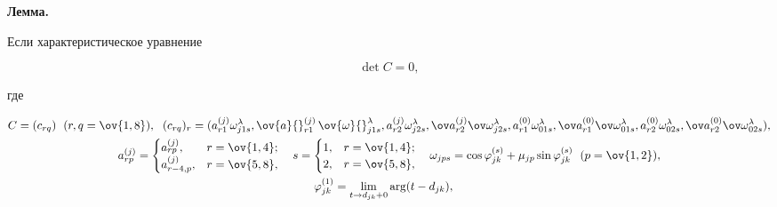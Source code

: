 {\bf Лемма.}{\it 


Если характеристическое уравнение 


\begin{equation} 


\det C=0, 


\end{equation} 


где 


\begin{gather*} 


C=(c_{rq})\ \; (r,q=\ov{1,8}),\ \;


(c_{rq})_r=(a^{(j)}_{r1}\omega^\lambda_{j1s}, 


\ov{a}{}^{(j)}_{r1}\,\ov{\omega}{}^\lambda_{j1s}, 


a^{(j)}_{r2}\omega^\lambda_{j2s},\ov a{}^{(j)}_{r2} 


\ov\omega{}^\lambda_{j2s},a^{(0)}_{r1}\omega^\lambda_{01s},


\ov a{}^{(0)}_{r1} 


\ov\omega{}^\lambda_{01s}, a^{(0)}_{r2} 


\omega^\lambda_{02s},\ov a{}^{(0)}_{r2} 


\ov\omega{}^\lambda_{02s}),\\ 


% 


a^{(j)}_{rp}= 


\begin{cases} 


a^{(j)}_{rp}, & r=\ov{1,4}; \\ 


a^{(j)}_{r-4,p}, & r=\ov{5,8}, 


\end{cases} 


\quad 


s= 


\begin{cases} 


1, & r=\ov{1,4}; \\ 


2, & r=\ov{5,8}, 


\end{cases} 


\quad 


\omega_{jps}=\cos\varphi^{(s)}_{jk}+ 


\mu_{jp}\sin\varphi^{(s)}_{jk}\ \; (p=\ov{1,2}),\\ 


%


\varphi^{(1)}_{jk}=\lim_{t\to d_{jk}+0}\arg(t-d_{jk}),\quad 



\end{gather*}}
